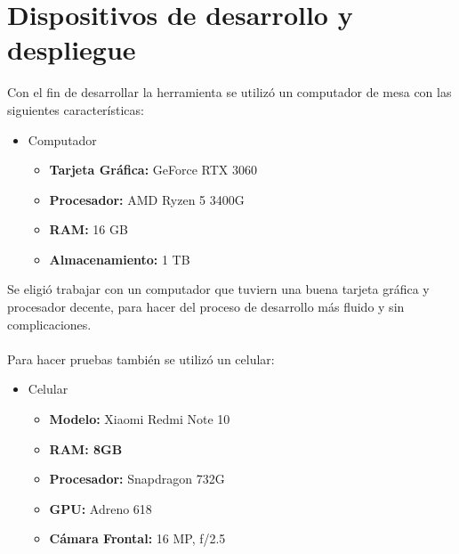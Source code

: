 
\section{Dispositivos de desarrollo y despliegue}
\noindent Con el fin de desarrollar la herramienta se utiliz\'o un computador de mesa con las siguientes caracter\'isticas:
\begin{itemize}
        \item Computador \begin{itemize}
            \item \textbf{Tarjeta Gr\'afica:} GeForce RTX 3060
            \item \textbf{Procesador:} AMD Ryzen 5 3400G
            \item \textbf{RAM:} 16 GB
            \item \textbf{Almacenamiento:} 1 TB
        \end{itemize}
    \end{itemize}
\noindent Se eligi\'o trabajar con un computador que tuviern una buena tarjeta gr\'afica y procesador decente, para hacer del proceso de desarrollo m\'as fluido y sin complicaciones. 
\\
\\
\noindent Para hacer pruebas tambi\'en se utiliz\'o un celular:
\begin{itemize}
    \item Celular \begin{itemize}
        \item \textbf{Modelo: } Xiaomi Redmi Note 10
        \item \textbf{RAM: 8GB }
        \item \textbf{Procesador:} Snapdragon 732G
        \item \textbf{GPU:} Adreno 618 
        \item \textbf{C\'amara Frontal:} 16 MP, f/2.5
        
    \end{itemize}
\end{itemize}


